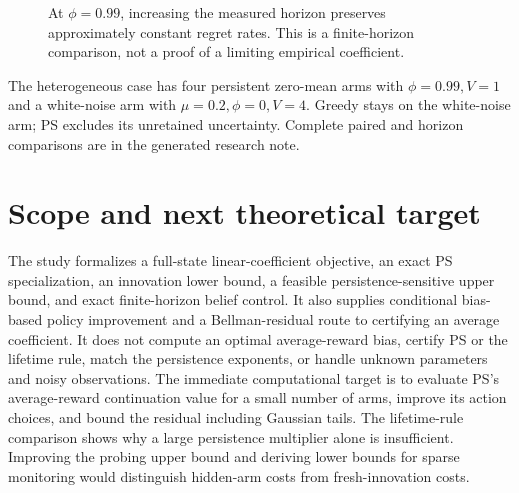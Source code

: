 \documentclass[11pt]{article}
\begin{document}
\begin{figure}[p]
\caption{At $\phi=0.99$, increasing the measured horizon preserves approximately constant regret rates. This is a finite-horizon comparison, not a proof of a limiting empirical coefficient.}
\end{figure}

The heterogeneous case has four persistent zero-mean arms with $\phi=0.99,V=1$ and a white-noise arm with $\mu=0.2,\phi=0,V=4$. Greedy stays on the white-noise arm; PS excludes its unretained uncertainty. Complete paired and horizon comparisons are in the generated research note.

\clearpage

\section{Scope and next theoretical target}
The study formalizes a full-state linear-coefficient objective, an exact PS specialization, an innovation lower bound, a feasible persistence-sensitive upper bound, and exact finite-horizon belief control. It also supplies conditional bias-based policy improvement and a Bellman-residual route to certifying an average coefficient. It does not compute an optimal average-reward bias, certify PS or the lifetime rule, match the persistence exponents, or handle unknown parameters and noisy observations. The immediate computational target is to evaluate PS's average-reward continuation value for a small number of arms, improve its action choices, and bound the residual including Gaussian tails. The lifetime-rule comparison shows why a large persistence multiplier alone is insufficient. Improving the probing upper bound and deriving lower bounds for sparse monitoring would distinguish hidden-arm costs from fresh-innovation costs.
\end{document}
